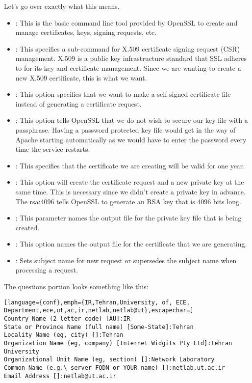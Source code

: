\documentclass{../UTNetLab}
\begin{document}
Let's go over exactly what this means.

\begin{itemize}
    \item {}: This is the basic command line tool provided by OpenSSL to create and manage certificates, keys, signing requests, etc.
    \item {}: This specifies a sub-command for X.509 certificate signing request (CSR) management.
          X.509 is a public key infrastructure standard that SSL adheres to for its key and certificate management.
          Since we are wanting to create a new X.509 certificate, this is what we want.
    \item {}: This option specifies that we want to make a self-signed certificate file instead of generating a certificate request.
    \item {}: This option tells OpenSSL that we do not wish to secure our key file with a passphrase.
          Having a password protected key file would get in the way of Apache starting automatically as we would have to enter the password every time the service restarts.
    \item {}: This specifies that the certificate we are creating will be valid for one year.
    \item {}: This option will create the certificate request and a new private key at the same time.
          This is necessary since we didn't create a private key in advance.
          The rsa:4096 tells OpenSSL to generate an RSA key that is 4096 bits long.
    \item {}: This parameter names the output file for the private key file that is being created.
    \item {}: This option names the output file for the certificate that we are generating.
    \item {}: Sets subject name for new request or supersedes the subject name when processing a request.
\end{itemize}

The questions portion looks something like this:
{\small
\begin{lstlisting}[language={conf},emph={IR,Tehran,University, of, ECE, Department,ece,ut,ac,ir,netlab,netlab@ut},escapechar=]
Country Name (2 letter code) [AU]:IR 
State or Province Name (full name) [Some-State]:Tehran 
Locality Name (eg, city) []:Tehran 
Organization Name (eg, company) [Internet Widgits Pty Ltd]:Tehran University 
Organizational Unit Name (eg, section) []:Network Laboratory 
Common Name (e.g.\ server FQDN or YOUR name) []:netlab.ut.ac.ir
Email Address []:netlab@ut.ac.ir
    \end{lstlisting}}
\end{document}
